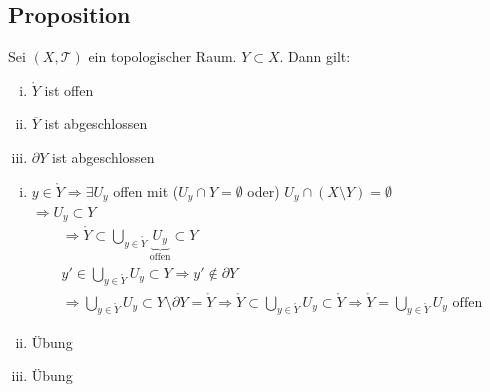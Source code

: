 \subsection[Proposition über Abgeschlossenheit/Offenheit von Rand etc.]{Proposition} %
\label{sub:210}
Sei $(X, \mathcal{T})$ ein topologischer Raum. $Y \subset X$. Dann gilt:
\begin{enumerate}[(i)]
	\item $\mathring{Y}$ ist offen
	\item $\overline{Y} $ ist abgeschlossen
	\item $\partial Y$ ist abgeschlossen
\end{enumerate}
\begin{enumerate}[(i)]
	\item $y \in \mathring{Y} \Rightarrow \exists U_y$ offen mit ($U_y \cap Y = \emptyset$ oder) $U_y \cap (X \setminus Y) = \emptyset$ \\
	$\Rightarrow U_y \subset Y$ 
	\begin{gather*}
		\Rightarrow \mathring{Y} \subset \bigcup_{y \in \mathring{Y}} \underbrace{U_y}_{\text{offen}} \subset Y \\
		y' \in \bigcup_{y \in \mathring{Y}} U_y \subset Y \Rightarrow y' \not\in \partial Y \\
		\Rightarrow \bigcup_{y \in \mathring{Y}} U_y \subset Y \setminus \partial Y = \mathring{Y} \Rightarrow \mathring{Y} \subset \bigcup_{y \in \mathring{Y}} U_y
		 \subset \mathring{Y} 
		\Rightarrow \mathring{Y} = \bigcup_{y \in \mathring{Y}} U_y \text{ offen}
	\end{gather*}
	\item Übung
	\item Übung
\end{enumerate}

